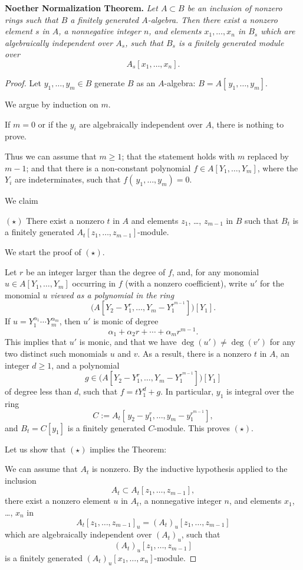 \documentclass[parskip=half,fontsize=12pt]{scrartcl}%
\begin{document}
\textbf{Noether Normalization Theorem.} \emph{Let $A\subset B$ be an inclusion of nonzero rings such that $B$ a finitely generated $A$-algebra. Then there exist a nonzero element $s$ in $A$, a nonnegative integer $n$, and elements $x_1,\dots,x_n$ in $B_s$ which are algebraically independent over $A_s$, such that $B_s$ is a finitely generated module over} 
$$
A_s[x_1,\dots,x_n].
$$ 
\begin{proof} 
Let $y_1,\dots,y_m\in B$ generate $B$ as an $A$-algebra: $B=A[\,y_1,\dots,y_m]$. 

We argue by induction on $m$. 

If $m=0$ or if the $y_i$ are algebraically independent over $A$, there is nothing to prove.

Thus we can assume that $m\ge1$; that the statement holds with $m$ replaced by $m-1$; and that there is a non-constant polynomial $f\in A[Y_1,\dots,Y_m]$, where the $Y_i$ are indeterminates, such that $f(\,y_1,\dots,y_m)=0$. %

We claim

$(\star)$ There exist a nonzero $t$ in $A$ and elements $z_1$, \dots, $z_{m-1}$ in $B$ such that $B_t$ is a finitely generated $A_t[z_1,\dots,z_{m-1}]$-module. 

We start the proof of $(\star)$. 

Let $r$ be an integer larger than the degree of $f$, and, for any monomial $u\in A[Y_1,\dots,Y_m]$ occurring in $f$ (with a nonzero coefficient), write $u'$ for the monomial $u$ \emph{viewed as a polynomial in the ring} 
$$
\bigg(A\left[Y_2-Y_1^r,\dots,Y_m-Y_1^{r^{m-1}}\right]\bigg)[Y_1].
$$ 
If $u=Y_1^{\alpha_1}\cdots Y_m^{\alpha_m}$, then $u'$ is monic of degree 
$$
\alpha_1+\alpha_2r+\cdots+\alpha_mr^{m-1}.
$$ 
This implies that $u'$ is monic, and that we have $\deg(u')\ne\deg(v')$ for any two distinct such monomials $u$ and $v$. %
As a result, there is a nonzero $t$ in $A$, an integer $d\ge1$, and a polynomial 
$$
g\in\bigg(A\left[Y_2-Y_1^r,\dots,Y_m-Y_1^{r^{m-1}}\right]\bigg)[Y_1]
$$ 
of degree less than $d$, such that $f=tY_1^d+g$. In particular, $y_1$ is integral over the ring 
$$
C:=A_t\left[\,y_2-y_1^r,\dots,y_m-y_1^{r^{m-1}}\right],
$$ 
and $B_t=C[y_1]$ is a finitely generated $C$-module. This proves $(\star)$.

Let us show that $(\star)$ implies the Theorem:

We can assume that $A_t$ is nonzero. By the inductive hypothesis applied to the inclusion 
$$
A_t\subset A_t[z_1,\dots,z_{m-1}],
$$ 
there exist a nonzero element $u$ in $A_t$, a nonnegative integer $n$, and elements $x_1$, \dots, $x_n$ in 
$$
A_t[z_1,\dots,z_{m-1}]_u=(A_t)_u[z_1,\dots,z_{m-1}]
$$ 
which are algebraically independent over $(A_t)_u$, such that 
$$
(A_t)_u[z_1,\dots,z_{m-1}]
$$ 
is a finitely generated $(A_t)_u[x_1,\dots,x_n]$-module. 


\end{proof}
\end{document}
